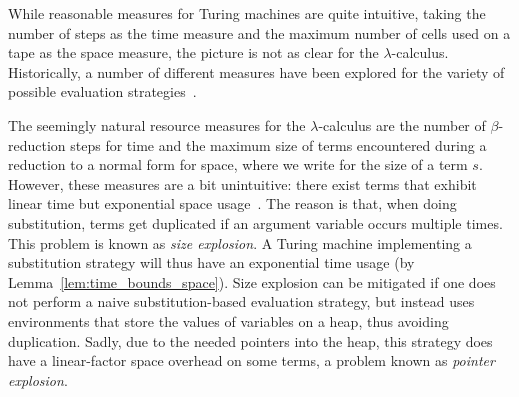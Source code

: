 While reasonable measures for Turing machines are quite intuitive, taking the number of steps as the time measure and the maximum number of cells used on a tape as the space measure, the picture is not as clear for the $\lambda$-calculus. Historically, a number of different measures have been explored for the variety of possible evaluation strategies~\cite{Accattoli:cost_models}.

The seemingly natural resource measures for the $\lambda$-calculus are the number of $\beta$-reduction steps for time and the maximum size of terms encountered during a reduction to a normal form for space, where we write  for the size of a term $s$. 
However, these measures are a bit unintuitive: there exist terms that exhibit linear time but exponential space usage~\cite{ForsterKunzeRoth:2019:wcbv-Reasonable}. The reason is that, when doing substitution, terms get duplicated if an argument variable occurs multiple times. This problem is known as \emph{size explosion}. A Turing machine implementing a substitution strategy will thus have an exponential time usage (by Lemma~\ref{lem:time_bounds_space}). 
Size explosion can be mitigated if one does not perform a naive substitution-based evaluation strategy, but instead uses environments that store the values of variables on a heap, thus avoiding duplication. Sadly, due to the needed pointers into the heap, this strategy does have a linear-factor space overhead on some terms, a problem known as \emph{pointer explosion}.


